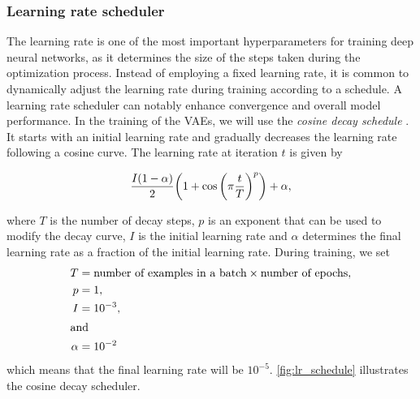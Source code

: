 \subsubsection{Learning rate scheduler}

The learning rate is one of the most important hyperparameters for training deep neural networks, as it determines the size of the steps taken during the optimization process. Instead of employing a fixed learning rate, it is common to dynamically adjust the learning rate during training according to a schedule. A learning rate scheduler can notably enhance convergence and overall model performance. In the training of the VAEs, we will use the \textit{cosine decay schedule} \citep{cosine_decay}. It starts with an initial learning rate and gradually decreases the learning rate following a cosine curve. The learning rate at iteration $t$ is given by

\begin{equation}\label{eq:cosine_decay}
    \frac{I \qty(1 - \alpha)}{2} \qty(1 + \cos \qty(\pi \frac{t}{T})^p) + \alpha,
\end{equation}

where $T$ is the number of decay steps, $p$ is an exponent that can be used to modify the decay curve, $I$ is the initial learning rate and $\alpha$ determines the final learning rate as a fraction of the initial learning rate. During training, we set 
\begin{align*}
    T &= \text{number of examples in a batch} \times \text{number of epochs}, \\
    p &= 1, \\
    I &= 10^{-3}, \\
    \intertext{and}
    \alpha &= 10^{-2}
\end{align*}
which means that the final learning rate will be $10^{-5}$. \autoref{fig:lr_schedule} illustrates the cosine decay scheduler.

